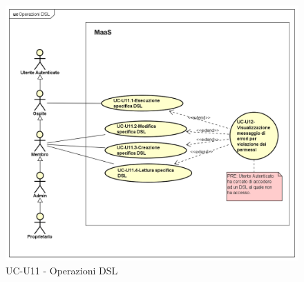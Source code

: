         \begin{figure}[H]
          \begin{center}
            \includegraphics[width=12cm]{res/img/UCUtenti/UCUtenteA/UC-U11-Operazioni DSL/UC-U11-Operazioni DSL}
          \caption{UC-U11 - Operazioni DSL}
          \end{center} 
        \end{figure}
        
